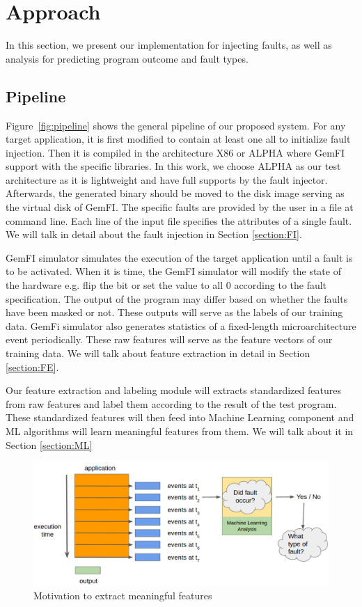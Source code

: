 \section{Approach}
In this section, we present our implementation for injecting faults, as well as analysis for predicting program outcome and fault types.

\subsection{Pipeline}
Figure~\ref{fig:pipeline} shows the general pipeline of our proposed system. For any target application, it is first modified to contain at least one all to initialize fault injection. Then it is compiled in the architecture X86 or ALPHA where GemFI support with the specific libraries. In this work, we choose ALPHA as our test architecture as it is lightweight and have full supports by the fault injector. Afterwards, the generated binary should be moved to the disk image serving as the virtual disk of GemFI. The specific faults are provided by the user in a file at command line. Each line of the input file specifies the attributes of a single fault. We will talk in detail about the fault injection in Section \ref{section:FI}. 

GemFI simulator simulates the execution of the target application until a fault is to be activated. When it is time, the GemFI simulator will modify the state of the hardware e.g. flip the bit or set the value to all 0 according to the fault specification. The output of the program may differ based on whether the faults have been masked or not. These outputs will serve as the labels of our training data. GemFi simulator also generates statistics of a fixed-length microarchitecture event periodically. These raw features will serve as the feature vectors of our training data. We will talk about feature extraction in detail in Section \ref{section:FE}. 

Our feature extraction and labeling module will extracts standardized features from raw features and label them according to the result of the test program. These standardized features will then feed into Machine Learning component and ML algorithms will learn meaningful features from them. We will talk about it in Section \ref{section:ML}

\begin{figure}[t]
\begin{center}
   \includegraphics[width=0.95\linewidth]{./figures/teaser.png}
\end{center}
   \caption{\footnotesize Motivation to extract meaningful features}
\label{fig:teaser}
\end{figure}

